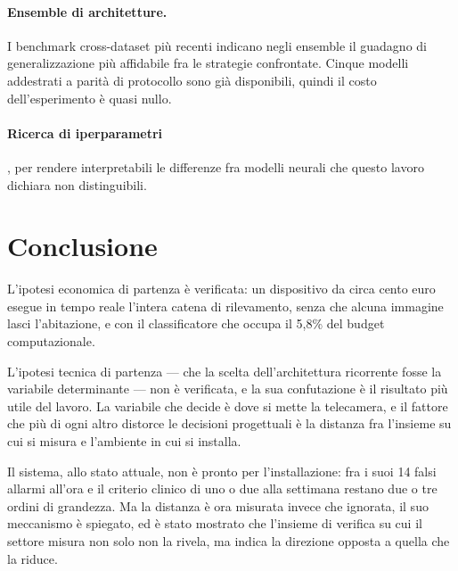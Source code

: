 \paragraph{Ensemble di architetture.} I benchmark cross-dataset più recenti indicano negli ensemble il guadagno di generalizzazione più affidabile fra le strategie confrontate. Cinque modelli addestrati a parità di protocollo sono già disponibili, quindi il costo dell'esperimento è quasi nullo.

\paragraph{Ricerca di iperparametri}, per rendere interpretabili le differenze fra modelli neurali che questo lavoro dichiara non distinguibili.

\section{Conclusione}

L'ipotesi economica di partenza è verificata: un dispositivo da circa cento euro esegue in tempo reale l'intera catena di rilevamento, senza che alcuna immagine lasci l'abitazione, e con il classificatore che occupa il 5,8\% del budget computazionale.

L'ipotesi tecnica di partenza --- che la scelta dell'architettura ricorrente fosse la variabile determinante --- non è verificata, e la sua confutazione è il risultato più utile del lavoro. La variabile che decide è dove si mette la telecamera, e il fattore che più di ogni altro distorce le decisioni progettuali è la distanza fra l'insieme su cui si misura e l'ambiente in cui si installa.

Il sistema, allo stato attuale, non è pronto per l'installazione: fra i suoi 14 falsi allarmi all'ora e il criterio clinico di uno o due alla settimana restano due o tre ordini di grandezza. Ma la distanza è ora misurata invece che ignorata, il suo meccanismo è spiegato, ed è stato mostrato che l'insieme di verifica su cui il settore misura non solo non la rivela, ma indica la direzione opposta a quella che la riduce.
